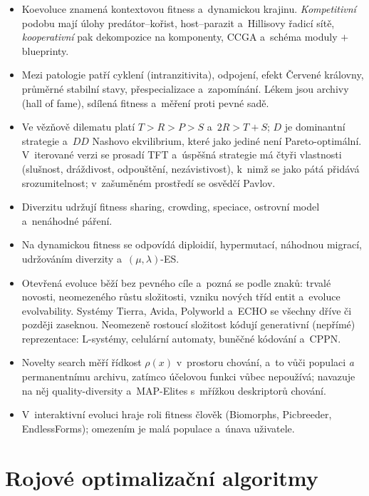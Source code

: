 \documentclass[11pt,a4paper]{article}
\theoremstyle{definition}
\begin{document}
\begin{itemize}
  (mutace $\to$ křížení $\to$ selekce).
\item Koevoluce znamená kontextovou fitness a~dynamickou krajinu.
  \emph{Kompetitivní} podobu mají úlohy predátor--kořist, host--parazit a~Hillisovy řadicí
  sítě, \emph{kooperativní} pak dekompozice na komponenty, CCGA a~schéma
  moduly $+$ blueprinty.
\item Mezi patologie patří cyklení (in\-tran\-zi\-ti\-vi\-ta), odpojení, efekt Červené
  královny, průměrné stabilní stavy, přespecializace a~zapomínání. Lékem jsou archivy
  (hall of fame), sdílená fitness a~měření proti pevné sadě.
\item Ve vězňově dilematu platí $T>R>P>S$ a~$2R > T+S$; $D$ je dominantní strategie
  a~$DD$ Nashovo ekvilibrium, které jako jediné není Pareto-optimální. V~iterované verzi
  se prosadí TFT a~úspěšná strategie má čtyři vlastnosti (slušnost, dráždivost, odpouštění,
  nezávistivost), k~nimž se jako pátá přidává srozumitelnost; v~zašuměném prostředí
  se osvědčí Pavlov.
\item Diverzitu udržují fitness sharing, crowding, speciace, ostrovní model
  a~nenáhodné páření.
\item Na dynamickou fitness se odpovídá diploidií, hypermutací, náhodnou migrací,
  udržováním diverzity a~$(\mu,\lambda)$-ES.
\item Otevřená evoluce běží bez pevného cíle a~pozná se podle znaků: trvalé novosti,
  neomezeného růstu složitosti, vzniku nových tříd entit a~evoluce evolvability.
  Systémy Tierra, Avida, Polyworld a~ECHO se všechny dříve či později zaseknou.
  Neomezeně rostoucí složitost kódují generativní (nepřímé) reprezentace: L-systémy,
  celulární automaty, buněčné kódování a~CPPN.
\item Novelty search měří řídkost $\rho(x)$ v~prostoru chování, a~to vůči populaci
  \emph{a} permanentnímu archivu, zatímco účelovou funkci vůbec nepoužívá;
  navazuje na něj quality-diversity a~MAP-Elites s~mřížkou deskriptorů chování.
\item V~interaktivní evoluci hraje roli fitness člověk (Biomorphs, Picbreeder,
  EndlessForms); omezením je malá populace a~únava uživatele.
\end{itemize}

\section{Rojové optimalizační algoritmy}
\label{sec:roje}
\end{document}
